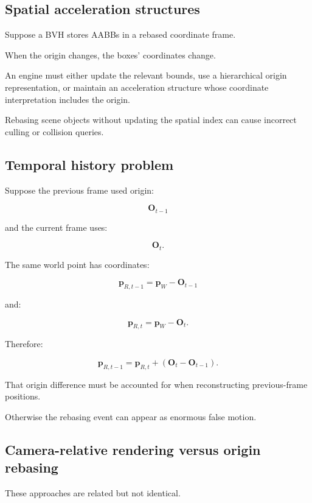 \subsection{Spatial acceleration structures}\label{02-foundations-ii-ch036-spatial-acceleration-structures}

Suppose a BVH stores AABBs in a rebased coordinate frame.

When the origin changes, the boxes' coordinates change.

An engine must either update the relevant bounds, use a hierarchical origin representation, or maintain an acceleration structure whose coordinate interpretation includes the origin.

Rebasing scene objects without updating the spatial index can cause incorrect culling or collision queries.

\subsection{Temporal history problem}\label{02-foundations-ii-ch036-temporal-history-problem}

Suppose the previous frame used origin:

\[
 \mathbf O_{t-1}
\]

and the current frame uses:

\[
 \mathbf O_t.
\]

The same world point has coordinates:

\[
 \mathbf p_{R,t-1} = \mathbf p_W-\mathbf O_{t-1}
\]

and:

\[
 \mathbf p_{R,t} = \mathbf p_W-\mathbf O_t.
\]

Therefore:

\[
 \boxed{ \mathbf p_{R,t-1} = \mathbf p_{R,t} + (\mathbf O_t-\mathbf O_{t-1}) }.
\]

That origin difference must be accounted for when reconstructing previous-frame positions.

Otherwise the rebasing event can appear as enormous false motion.

\subsection{Camera-relative rendering versus origin rebasing}\label{02-foundations-ii-ch036-camera-relative-rendering-versus-origin-rebasing}

These approaches are related but not identical.

